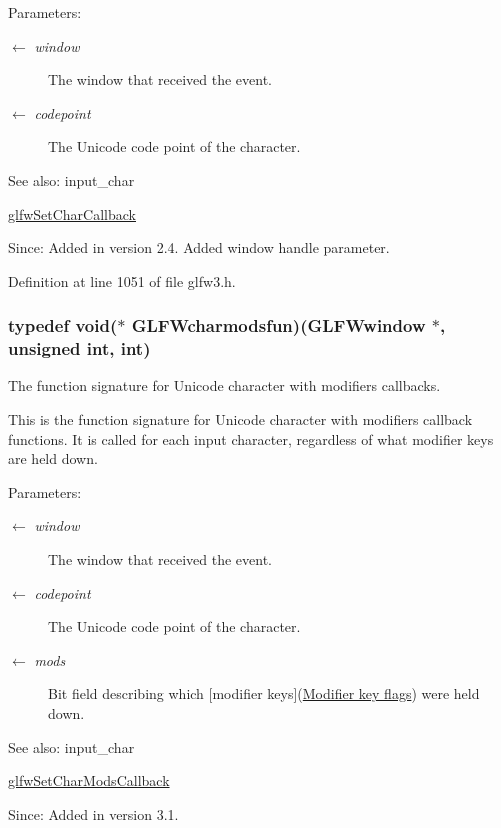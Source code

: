 \begin{Desc}
\item[Parameters:]
\begin{description}
\item[\mbox{$\leftarrow$} {\em window}]The window that received the event. \item[\mbox{$\leftarrow$} {\em codepoint}]The Unicode code point of the character.\end{description}
\end{Desc}
\begin{Desc}
\item[See also:]input\_\-char 

\hyperlink{group__input_g07b2959b23dc3e466ce7475746021002}{glfwSetCharCallback}\end{Desc}
\begin{Desc}
\item[Since:]Added in version 2.4.  Added window handle parameter. \end{Desc}


Definition at line 1051 of file glfw3.h.\hypertarget{group__input_g3826e9cf33f760c1480d6ce873f9d002}{
\subsubsection[GLFWcharmodsfun]{\setlength{\rightskip}{0pt plus 5cm}typedef void($\ast$  {\bf GLFWcharmodsfun})({\bf GLFWwindow} $\ast$, unsigned int, int)}}
\label{group__input_g3826e9cf33f760c1480d6ce873f9d002}


The function signature for Unicode character with modifiers callbacks. 

This is the function signature for Unicode character with modifiers callback functions. It is called for each input character, regardless of what modifier keys are held down.

\begin{Desc}
\item[Parameters:]
\begin{description}
\item[\mbox{$\leftarrow$} {\em window}]The window that received the event. \item[\mbox{$\leftarrow$} {\em codepoint}]The Unicode code point of the character. \item[\mbox{$\leftarrow$} {\em mods}]Bit field describing which \mbox{[}modifier keys\mbox{]}(\hyperlink{group__mods}{Modifier key flags}) were held down.\end{description}
\end{Desc}
\begin{Desc}
\item[See also:]input\_\-char 

\hyperlink{group__input_ge6eee0bda7429bfe8028615847cf6795}{glfwSetCharModsCallback}\end{Desc}
\begin{Desc}
\item[Since:]Added in version 3.1. \end{Desc}


